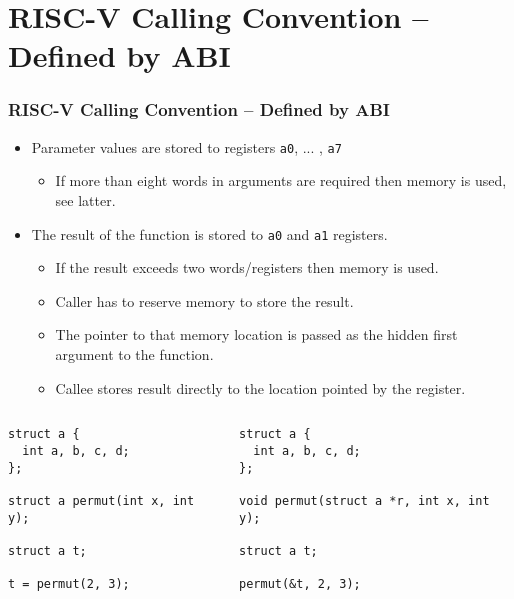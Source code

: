 \documentclass{beamer}
\begin{document}
\section{RISC-V Calling Convention -- Defined by ABI}

\begin{frame}[fragile]
\frametitle{RISC-V Calling Convention -- Defined by ABI}

\begin{itemize}
 \item Parameter values are stored to registers \texttt{a0}, ... , \texttt{a7}
\begin{itemize}
 \item If more than eight words in arguments are required then memory is used, see latter.
\end{itemize}
 \item The result of the function is stored to \texttt{a0} and \texttt{a1} registers.
\begin{itemize}
 \item If the result exceeds two words/registers then memory is used.
 \item Caller has to reserve memory to store the result.
 \item The pointer to that memory location is passed as the hidden first argument to the function.
 \item Callee stores result directly to the location pointed by the register.
\end{itemize}
\end{itemize}

\begin{columns}
\begin{column}{0.45\textwidth}  
\begin{verbatim}
struct a {
  int a, b, c, d;
};

struct a permut(int x, int y);

struct a t;

t = permut(2, 3);
\end{verbatim}
\end{column}
\begin{column}{0.55\textwidth}  
\begin{verbatim}
struct a {
  int a, b, c, d;
};

void permut(struct a *r, int x, int y);

struct a t;

permut(&t, 2, 3);
\end{verbatim}
\end{column}
\end{columns}
\end{frame}
\end{document}
